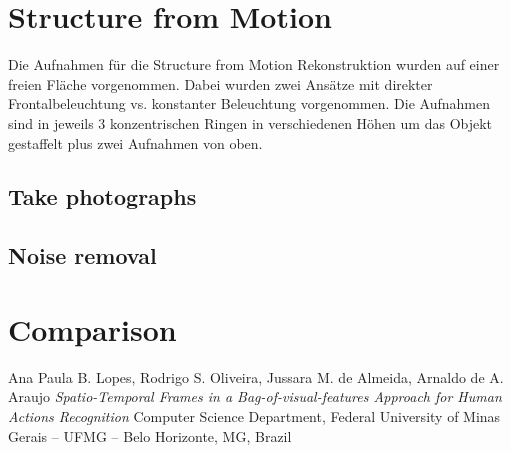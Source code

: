 \documentclass[]{article}
\begin{document}
\section{Structure from Motion}

Die Aufnahmen für die Structure from Motion Rekonstruktion wurden auf einer freien Fläche vorgenommen. Dabei wurden zwei Ansätze mit direkter Frontalbeleuchtung vs. konstanter Beleuchtung vorgenommen.
Die Aufnahmen sind in jeweils 3 konzentrischen Ringen in verschiedenen Höhen um das Objekt gestaffelt plus zwei Aufnahmen von oben.

\subsection{Take photographs}

\subsection{Noise removal}


\section{Comparison}




\begin{thebibliography}{1}

   Ana Paula B. Lopes, Rodrigo S. Oliveira, Jussara M. de Almeida, Arnaldo de A. Araujo {\em Spatio-Temporal Frames in a Bag-of-visual-features Approach for Human Actions Recognition} Computer Science Department, Federal University of Minas Gerais – UFMG – Belo Horizonte, MG, Brazil
\end{thebibliography}        

		
\end{document}
